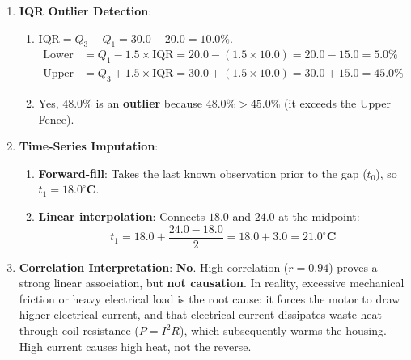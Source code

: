\begin{enumerate}
    \item \textbf{IQR Outlier Detection}:
    \begin{enumerate}
        \item $\text{IQR} = Q_3 - Q_1 = 30.0 - 20.0 = 10.0\%$.
        \begin{align*}
        \text{Lower Fence} &= Q_1 - 1.5 \times \text{IQR} = 20.0 - (1.5 \times 10.0) = 20.0 - 15.0 = 5.0\% \\
        \text{Upper Fence} &= Q_3 + 1.5 \times \text{IQR} = 30.0 + (1.5 \times 10.0) = 30.0 + 15.0 = 45.0\%
        \end{align*}
        \item Yes, $48.0\%$ is an \textbf{outlier} because $48.0\% > 45.0\%$ (it exceeds the Upper Fence).
    \end{enumerate}

    \item \textbf{Time-Series Imputation}:
    \begin{enumerate}
        \item \textbf{Forward-fill}: Takes the last known observation prior to the gap ($t_0$), so $t_1 = \mathbf{18.0^\circ\text{C}}$.
        \item \textbf{Linear interpolation}: Connects $18.0$ and $24.0$ at the midpoint:
        \begin{equation*}
        t_1 = 18.0 + \frac{24.0 - 18.0}{2} = 18.0 + 3.0 = \mathbf{21.0^\circ\text{C}}
        \end{equation*}
    \end{enumerate}

    \item \textbf{Correlation Interpretation}:
    \textbf{No}. High correlation ($r = 0.94$) proves a strong linear association, but \textbf{not causation}. In reality, excessive mechanical friction or heavy electrical load is the root cause: it forces the motor to draw higher electrical current, and that electrical current dissipates waste heat through coil resistance ($P = I^2 R$), which subsequently warms the housing. High current causes high heat, not the reverse.
\end{enumerate}
